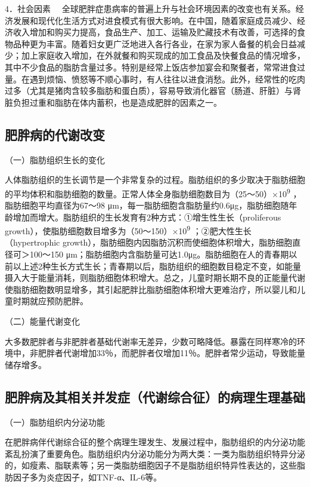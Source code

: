 {4．社会因素}
　全球肥胖症患病率的普遍上升与社会环境因素的改变也有关系。经济发展和现代化生活方式对进食模式有很大影响。在中国，随着家庭成员减少、经济收入增加和购买力提高，食品生产、加工、运输及贮藏技术有改善，可选择的食物品种更为丰富。随着妇女更广泛地进入各行各业，在家为家人备餐的机会日益减少；加上家庭收入增加，在外就餐和购买现成的加工食品及快餐食品的情况增多，其中不少食品的脂肪含量过多。特别是经常上饭店参加宴会和聚餐者，常常进食过量。在遇到烦恼、愤怒等不顺心事时，有人往往以进食消愁。此外，经常性的吃肉过多（尤其是猪肉含较多脂肪和蛋白质），容易导致消化器官（肠道、肝脏）与肾脏负担过重和脂肪在体内蓄积，也是造成肥胖的因素之一。

\hypertarget{text00004.htmlux5cux23mllj14}{%
\subsection{肥胖病的代谢改变}\label{text00004.htmlux5cux23mllj14}}

（一）脂肪组织生长的变化

人体脂肪组织的生长调节是一个非常复杂的过程。脂肪组织的多少取决于脂肪细胞的平均体积和脂肪细胞的数量。正常人体全身脂肪细胞数目为（25～50）×10\textsuperscript{9}
，脂肪细胞平均直径为67～98
μm，每一脂肪细胞含脂肪量约0.6μg，脂肪细胞随年龄增加而增大。脂肪组织的生长发育有2种方式：①增生性生长（proliferous
growth），使脂肪细胞数目增多为（50～150）×10\textsuperscript{9}
；②肥大性生长（hypertrophic
growth），脂肪细胞内因脂肪沉积而使细胞体积增大，脂肪细胞直径可＞100～150
μm；脂肪细胞内含脂肪量可达1.0μg。脂肪细胞在人的青春期以前以上述2种生长方式生长；青春期以后，脂肪组织的细胞数目稳定不变，如能量摄入大于能量消耗，则脂肪细胞体积增大。总之，儿童时期长期不良的正能量代谢使脂肪细胞数明显增多，其引起肥胖比脂肪细胞体积增大更难治疗，所以婴儿和儿童时期就应预防肥胖。

（二）能量代谢变化

大多数肥胖者与非肥胖者基础代谢率无差异，少数可略降低。暴露在同样寒冷的环境中，非肥胖者代谢增加33％，而肥胖者仅增加11％。肥胖者常少运动，导致能量储存增多。

\hypertarget{text00004.htmlux5cux23mllj15}{%
\subsection{肥胖病及其相关并发症（代谢综合征）的病理生理基础}\label{text00004.htmlux5cux23mllj15}}

（一）脂肪组织内分泌功能

在肥胖病伴代谢综合征的整个病理生理发生、发展过程中，脂肪组织的内分泌功能紊乱扮演了重要角色。脂肪组织内分泌功能分为两大类：一类为脂肪组织特异分泌的，如瘦素、脂联素等；另一类脂肪细胞因子不是脂肪组织特异性表达的，这些脂肪因子多为炎症因子，如TNF-α、IL-6等。

